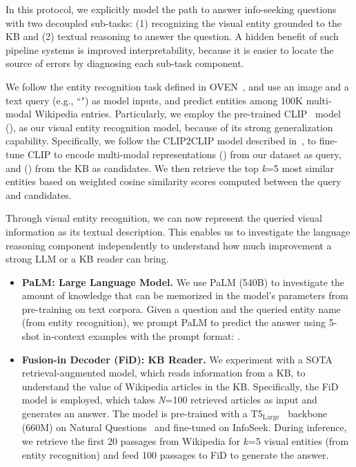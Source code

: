 \documentclass[11pt]{article}
\begin{document}
In this protocol, we explicitly model the path to answer info-seeking questions with two decoupled sub-tasks: (1) recognizing the visual entity grounded to the KB and (2) textual reasoning to answer the question. A hidden benefit of such pipeline systems is improved interpretability, because it is easier to locate the source of errors by diagnosing each sub-task component.

We follow the entity recognition task defined in OVEN~\cite{hu2023opendomain}, and use an image and a text query (e.g., ``") as model inputs, and predict entities among 100K multi-modal Wikipedia entries.
Particularly, we employ the pre-trained CLIP~\cite{radford2021clip} model (), as our visual entity recognition model, because of its strong generalization capability.
Specifically, we follow the CLIP2CLIP model described in~\citeauthor{hu2023opendomain}, to fine-tune CLIP to encode multi-modal representations () from our dataset as query, and () from the KB as candidates.
We then retrieve the top \textit{k}=5 most similar entities based on weighted cosine similarity scores computed between the query and candidates. 

Through visual entity recognition, we can now represent the queried visual information as its textual description.
This enables us to investigate the language reasoning component independently to understand how much improvement a strong LLM or a KB reader can bring.

\begin{itemize}[leftmargin=*,topsep=0pt,itemsep=0pt]
    \item \textbf{PaLM: Large Language Model.}
    We use PaLM (540B) to investigate the amount of knowledge that can be memorized in the model's parameters from pre-training on text corpora.
    Given a question and the queried entity name (from entity recognition), we prompt PaLM to predict the answer using 5-shot in-context examples with the prompt format: .
    \item \textbf{Fusion-in Decoder (FiD): KB Reader.}
    We experiment with a SOTA retrieval-augmented model, which reads information from a KB, to understand the value of Wikipedia articles in the KB.
    Specifically, the FiD~\cite{izacard2020fid} model is employed, which takes \textit{N}=100 retrieved articles as input and generates an answer. 
    The model is pre-trained with a T5$_\text{Large}$~\cite{2020t5} backbone (660M) on Natural Questions~\cite{kwiatkowski-etal-2019-natural} and fine-tuned on {\sc InfoSeek}. 
    During inference, we retrieve the first 20 passages from Wikipedia for $k$=5 visual entities (from entity recognition) and feed 100 passages to FiD to generate the answer. 
\end{itemize}
 
\end{document}
